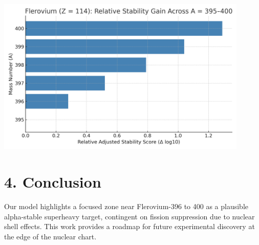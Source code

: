 \documentclass[12pt]{article}
\begin{document}
\begin{center}
\includegraphics[width=0.9\textwidth]{relative_stability.png}
\end{center}

\section*{4. Conclusion}
Our model highlights a focused zone near Flerovium-396 to 400 as a plausible alpha-stable superheavy target, contingent on fission suppression due to nuclear shell effects. This work provides a roadmap for future experimental discovery at the edge of the nuclear chart.
\end{document}
